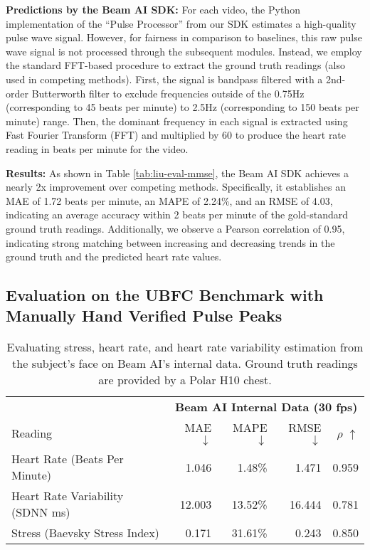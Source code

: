 \documentclass{article}
\begin{document}
\textbf{Predictions by the Beam AI SDK:} For each video, the Python implementation of the ``Pulse Processor'' from our SDK estimates a high-quality pulse wave signal. However, for fairness in comparison to baselines, this raw pulse wave signal is not processed through the subsequent modules. Instead, we employ the standard FFT-based procedure to extract the ground truth readings (also used in competing methods). First, the signal is bandpass filtered with a 2nd-order Butterworth \cite{Selesnick96_Butterworth} filter to exclude frequencies outside of the 0.75Hz (corresponding to 45 beats per minute) to 2.5Hz (corresponding to 150 beats per minute) range. Then, the dominant frequency in each signal is extracted using Fast Fourier Transform (FFT) \cite{Brigham67_FFT} and multiplied by 60 to produce the heart rate reading in beats per minute for the video.

\textbf{Results:} As shown in Table \ref{tab:liu-eval-mmse}, the Beam AI SDK achieves a nearly 2x improvement over competing methods. Specifically, it establishes an MAE of 1.72 beats per minute, an MAPE of 2.24\%, and an RMSE of 4.03, indicating an average accuracy within 2 beats per minute of the gold-standard ground truth readings. Additionally, we observe a Pearson correlation of 0.95, indicating strong matching between increasing and decreasing trends in the ground truth and the predicted heart rate values.

\subsection{Evaluation on the UBFC Benchmark with Manually Hand Verified Pulse Peaks}
\label{sec:ubfc-clean}

\begin{table}[t]
    \centering
    \tabcolsep=0.5cm
    \begin{tabular}{lrrrr}
        {} & \multicolumn{4}{c}{\textbf{Beam AI Internal Data (30 fps)}} \\
        Reading & MAE$\downarrow$ & MAPE$\downarrow$ & RMSE$\downarrow$ & $\rho$ $\uparrow$ \\
        \midrule
        Heart Rate {\small (Beats Per Minute)} & 1.046 & 1.48\% & 1.471 & 0.959 \\
        Heart Rate Variability {\small (SDNN ms)} & 12.003 & 13.52\% & 16.444 & 0.781 \\ 
        Stress {\small (Baevsky Stress Index)} & 0.171 & 31.61\% & 0.243 & 0.850 \\
    \end{tabular}
    \vspace{0.05in}
    \caption{Evaluating stress, heart rate, and heart rate variability estimation from the subject's face on Beam AI's internal data. Ground truth readings are provided by a Polar H10 chest.}
    \label{tab:beam-ai-internal-benchmark}
    \vspace{-0.2in}
\end{table}
\end{document}
